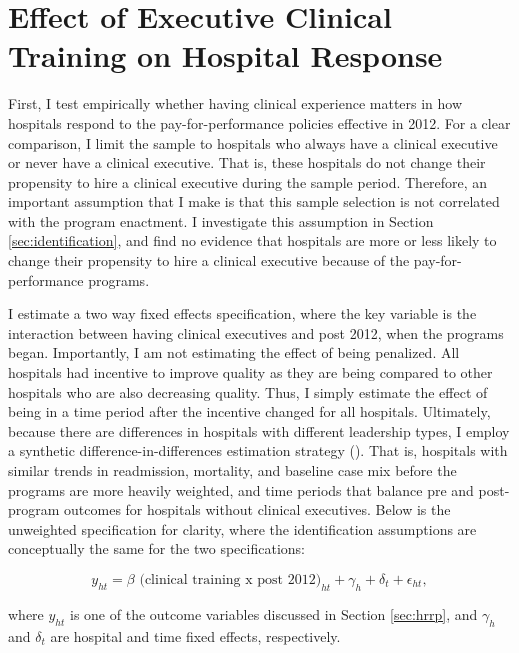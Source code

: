 \documentclass[12pt]{article}
\begin{document}
    \section{Effect of Executive Clinical Training on Hospital Response}\label{sec:clinical}

    First, I test empirically whether having clinical experience matters in how hospitals respond to the pay-for-performance policies effective in 2012. For a clear comparison, I limit the sample to hospitals who always have a clinical executive or never have a clinical executive. That is, these hospitals do not change their propensity to hire a clinical executive during the sample period. Therefore, an important assumption that I make is that this sample selection is not correlated with the program enactment. I investigate this assumption in Section \ref{sec:identification}, and find no evidence that hospitals are more or less likely to change their propensity to hire a clinical executive because of the pay-for-performance programs. 
    
    I estimate a two way fixed effects specification, where the key variable is the interaction between having clinical executives and post 2012, when the programs began. Importantly, I am not estimating the effect of being penalized. All hospitals had incentive to improve quality as they are being compared to other hospitals who are also decreasing quality. Thus, I simply estimate the effect of being in a time period after the incentive changed for all hospitals. Ultimately, because there are differences in hospitals with different leadership types, I employ a synthetic difference-in-differences estimation strategy (\cite{arkhangelsky2021synthetic}). That is, hospitals with similar trends in readmission, mortality, and baseline case mix before the programs are more heavily weighted, and time periods that balance pre and post-program outcomes for hospitals without clinical executives. Below is the unweighted specification for clarity, where the identification assumptions are conceptually the same for the two specifications: 

    \begin{equation}
    \label{eq:clinical}
    y_{ht} = \beta \text{ (clinical training x post 2012)}_{ht} + \gamma_{h} + \delta_t + \epsilon_{ht},
    \end{equation}
    

    \noindent where $y_{ht}$ is one of the outcome variables discussed in Section \ref{sec:hrrp}, and $\gamma_h$ and $\delta_t$ are hospital and time fixed effects, respectively. 
\end{document}
